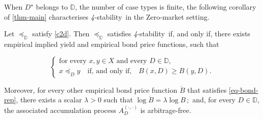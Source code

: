 \documentclass[12pt,a4paper,twoside]{article}
\newcommand{\mbbd}{{\mathds D}}
\newcommand{\dd}{{(\cdot,\cdot)}}
\newcommand{\stability}{\textit{4}-\textup{{stability}}}
\begin{document}
When $D^{\star}$ belongs to $\mbbd$, the number of case types is finite, the
following corollary of \cref{thm-main} characterises \stability\ in the
Zero-market setting.
\begin{corollary}\label{cor-bond-rep}
  Let $\preceq_{\mbbd}$ satisfy \ref{c2d}. Then $\preceq_{\mbbd}$ satisfies
  \stability\ if, and only if, there exists empirical implied yield and empirical
  bond price functions, such that
  \begin{linenomath*} 
    \begin{equation}\tag{$*$}\label{eq-bond-rep}
 \left\{
  \begin{array}{l}
    \text{for every $x , y \in X$ and every $D \in \mbbd$,}\\
      x \preceq_{D} y \quad \text{if, and only if,}\quad B(x,D) \geq B(y,D).
  \end{array}\right.
      \end{equation}
    \end{linenomath*} 
    Moreover, for every other empirical bond price function $\acute{B}$ that
    satisfies \eqref{eq-bond-rep}, there exists a scalar $\lambda > 0$ such
    that $\log \acute{B} = \lambda \log B\,;$ and, for every $D\in \mbbd$, the
    associated accumulation process ${A}^{\dd}_{D}$ is arbitrage-free.

\end{corollary}
\end{document}
